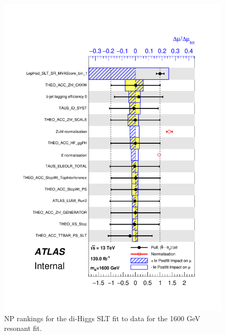    \begin{figure}
   \centering
   \includegraphics[width=.8\textwidth]{figures/results/HH/LepHad/pulls_SigXsecOverSM_1600_SLT.pdf}
   \caption{NP rankings for the di-Higgs \lephad SLT fit to data for the 1600 GeV resonant fit.}
   \label{fig:LepHadPostfitNPRankings2HDM1600SLT}
   \end{figure}
   
